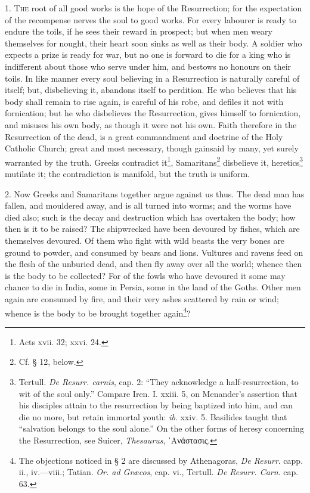 1. \textsc{The} root of all good works is the hope of the Resurrection; for the expectation of the recompense nerves the soul to good works. For every labourer is ready to endure the toils, if he sees their reward in prospect; but when men weary themselves for nought, their heart soon sinks as well as their body. A soldier who expects a prize is ready for war, but no one is forward to die for a king who is indifferent about those who serve under him, and bestows no honours on their toils. In like manner every soul believing in a Resurrection is naturally careful of itself; but, disbelieving it, abandons itself to perdition. He who believes that his body shall remain to rise again, is careful of his robe, and defiles it not with fornication; but he who disbelieves the Resurrection, gives himself to fornication, and misuses his own body, as though it were not his own. Faith therefore in the Resurrection of the dead, is a great commandment and doctrine of the Holy Catholic Church; great and most necessary, though gainsaid by many, yet surely warranted by the truth. Greeks contradict it\footnote{Acts xvii. 32; xxvi. 24.}, Samaritans\footnote{Cf. § 12, below.} disbelieve it, heretics\footnote{Tertull. \emph{De Resurr. carnis}, cap. 2: “They acknowledge a half-resurrection, to wit of the soul only.” Compare Iren. I. xxiii. 5, on Menander’s assertion that his disciples attain to the resurrection by being baptized into him, and can die no more, but retain immortal youth: \emph{ib}. xxiv. 5. Basilides taught that “salvation belongs to the soul alone.” On the other forms of heresy concerning the Resurrection, see Suicer, \emph{Thesaurus}, \textgreek{᾽Ανάστασις}.} mutilate it; the contradiction is manifold, but the truth is uniform.

2. Now Greeks and Samaritans together argue against us thus. The dead man has fallen, and mouldered away, and is all turned into worms; and the worms have died also; such is the decay and destruction which has overtaken the body; how then is it to be raised? The shipwrecked have been devoured by fishes, which are themselves devoured. Of them who fight with wild beasts the very bones are ground to powder, and consumed by bears and lions. Vultures and ravens feed on the flesh of the unburied dead, and then fly away over all the world; whence then is the body to be collected? For of the fowls who have devoured it some may chance to die in India, some in Persia, some in the land of the Goths. Other men again are consumed by fire, and their very ashes scattered by rain or wind; whence is the body to be brought together again\footnote{The objections noticed in § 2 are discussed by Athenagoras, \emph{De Resurr}. capp. ii., iv.—viii.; Tatian. \emph{Or. ad Græcos}, cap. vi., Tertull. \emph{De Resurr. Carn}. cap. 63.}?

